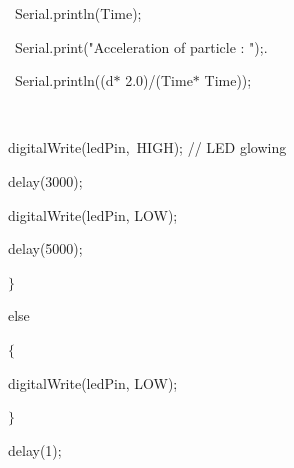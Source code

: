 \documentclass[12pt]{article}
\begin{document}
{\fontsize{14pt}{16.8pt}\selectfont \ \  Serial.println(Time);\par}\par

{\fontsize{14pt}{16.8pt}\selectfont \ \  Serial.print("Acceleration of particle : ");.\par}\par

{\fontsize{14pt}{16.8pt}\selectfont \ \  Serial.println((d$\ast$ 2.0)/(Time$\ast$ Time));\par}\par

{\fontsize{14pt}{16.8pt}\selectfont \  \par}\par

{\fontsize{14pt}{16.8pt}\selectfont \  digitalWrite(ledPin,\ HIGH);  // LED glowing\par}\par

{\fontsize{14pt}{16.8pt}\selectfont \  delay(3000);\par}\par

{\fontsize{14pt}{16.8pt}\selectfont \  digitalWrite(ledPin, LOW);\par}\par

{\fontsize{14pt}{16.8pt}\selectfont \  delay(5000);\par}\par

{\fontsize{14pt}{16.8pt}\selectfont \  $ \} $ \par}\par

{\fontsize{14pt}{16.8pt}\selectfont \  else\par}\par

{\fontsize{14pt}{16.8pt}\selectfont \  $ \{ $ \par}\par

{\fontsize{14pt}{16.8pt}\selectfont \  digitalWrite(ledPin, LOW);\par}\par

{\fontsize{14pt}{16.8pt}\selectfont \  $ \} $ \par}\par

{\fontsize{14pt}{16.8pt}\selectfont \  delay(1);\par}\par
\end{document}
